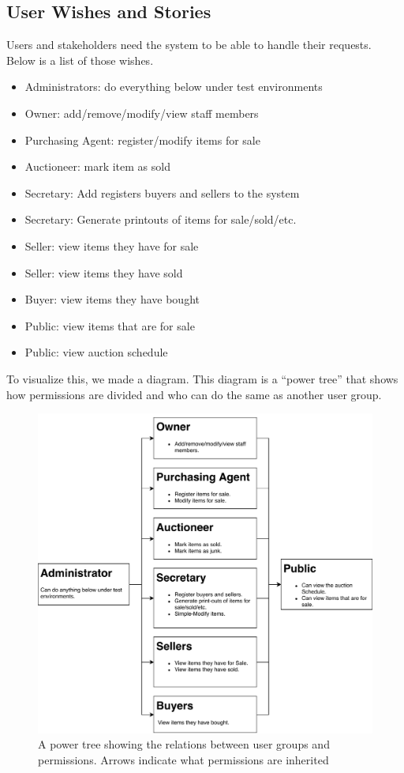 \documentclass{article}
\begin{document}
\subsection*{User Wishes and Stories}
Users and stakeholders need the system to be able to handle their requests. Below is a list of those wishes.
\begin{itemize}[noitemsep]
	\item Administrators: do everything below under test environments
	\item Owner: add/remove/modify/view staff members
	\item Purchasing Agent: register/modify items for sale
	\item Auctioneer: mark item as sold
	\item Secretary: Add registers buyers and sellers to the system
	\item Secretary: Generate printouts of items for sale/sold/etc.
	\item Seller: view items they have for sale
	\item Seller: view items they have sold
	\item Buyer: view items they have bought
	\item Public: view items that are for sale
	\item Public: view auction schedule
\end{itemize}
To visualize this, we made a diagram. This diagram is a ``power tree'' that shows how permissions are divided and who can do the same as another user group.
\begin{figure}[H]
	\centering
	\includegraphics[scale=.75]{power_tree.pdf}
	\caption*{A power tree showing the relations between user groups and permissions. Arrows indicate what permissions are inherited}
\end{figure}
\end{document}
